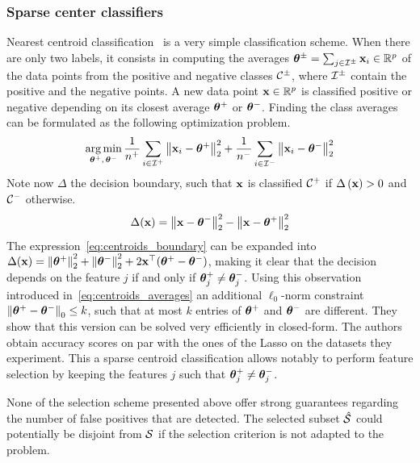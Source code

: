 \subsubsection{Sparse center classifiers}\label{subsubsec:centroids}

Nearest centroid classification~\citep{centroid_classification} is a very simple classification scheme.
When there are only two labels,
it consists in computing the averages $\bm{\theta}^\pm = \sum_{j \in \mathcal{I}^\pm} \mathbf{x}_i \in \mathbb{R}^p$
of the data points from the positive and negative classes $\mathcal{C}^\pm$,
where $\mathcal{I}^\pm$ contain the positive and the negative points.
A new data point $\mathbf{x} \in \mathbb{R}^p$ is classified positive or negative depending on its closest average
$\bm{\theta}^+$ or $\bm{\theta}^-$.
Finding the class averages can be formulated as the following optimization problem.
\begin{equation}\label{eq:centroids_averages}
    \operatorname*{arg\,min}_{\bm{\theta}^+,\, \bm{\theta}^-}
        \frac{1}{n^+} \sum_{i \in \mathcal{I}^+} \big\lVert \mathbf{x}_i - \bm{\theta}^+ \big\rVert^2_2
        + \frac{1}{n^-} \sum_{i \in \mathcal{I}^-} \big\lVert \mathbf{x}_i - \bm{\theta}^- \big\rVert^2_2
\end{equation}
Note now $\Delta$ the decision boundary,
such that $\mathbf{x}$ is classified $\mathcal{C}^+$ if $\Delta\left( \mathbf{x} \right) > 0$ and $\mathcal{C}^-$ otherwise.
\begin{equation}\label{eq:centroids_boundary}
    \Delta(\mathbf{x}) = \left\lVert\mathbf{x} - \bm{\theta}^-\right\rVert^2_2 - \left\lVert\mathbf{x} - \bm{\theta}^+\right\rVert^2_2
\end{equation}
The expression~\ref{eq:centroids_boundary} can be expanded into
$\Delta(\mathbf{x}) = \left\lVert\bm{\theta}^+\right\rVert^2_2 + \left\lVert\bm{\theta}^-\right\rVert^2_2 + 2\mathbf{x}^\top(\bm{\theta}^+ - \bm{\theta}^-)$,
making it clear that the decision depends on the feature $j$ if and only if $\bm{\theta}^+_j \neq \bm{\theta}^-_j$.
Using this observation~\cite{sparse_center_classifiers} introduced in~\ref{eq:centroids_averages}
an additional $\ell_0$-norm constraint $\left\lVert\bm{\theta}^+ - \bm{\theta}^-\right\rVert_0 \leq k$,
such that at most $k$ entries of $\bm{\theta}^+$ and $\bm{\theta}^-$ are different.
They show that this version can be solved very efficiently in closed-form.
The authors obtain accuracy scores on par with the ones of the Lasso on the datasets they experiment.
This a sparse centroid classification allows notably to perform feature selection
by keeping the features $j$ such that $\bm{\theta}^+_j \neq \bm{\theta}^-_j$.

\bigbreak
None of the selection scheme presented above offer strong guarantees regarding
the number of false positives that are detected.
The selected subset $\hat{\mathcal{S}}$ could potentially be disjoint from $\mathcal{S}$
if the selection criterion is not adapted to the problem.

